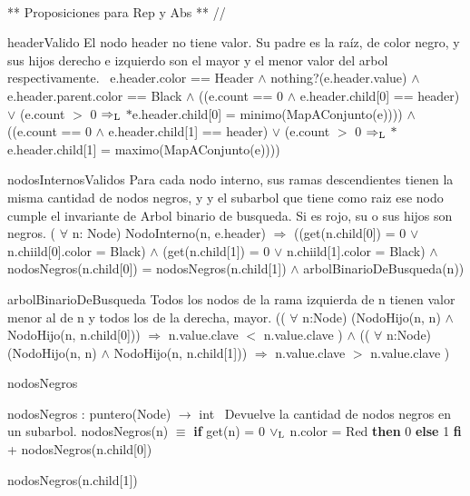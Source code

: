 \begin{DoxyVerb}\\ ** Proposiciones para Rep y Abs ** //
\end{DoxyVerb}


\begin{DoxyParagraph}{header\+Valido}
El nodo header no tiene valor. Su padre es la raíz, de color negro, y sus hijos derecho e izquierdo son el mayor y el menor valor del arbol respectivamente.~\newline
 e.\+header.\+color == Header $\land$ nothing?(e.\+header.\+value) $\land$ e.\+header.\+parent.\+color == Black $\land$ ((e.\+count == 0 $\land$ e.\+header.\+child\mbox{[}0\mbox{]} == header) $\lor$ (e.\+count $>$ 0 $\Rightarrow_{\rm L}$ $\ast$e.header.\+child\mbox{[}0\mbox{]} = minimo(\+Map\+A\+Conjunto(e)))) $\land$ ((e.\+count == 0 $\land$ e.\+header.\+child\mbox{[}1\mbox{]} == header) $\lor$ (e.\+count $>$ 0 $\Rightarrow_{\rm L}$ $\ast$e.header.\+child\mbox{[}1\mbox{]} = maximo(\+Map\+A\+Conjunto(e)))) 
\end{DoxyParagraph}


\begin{DoxyParagraph}{nodos\+Internos\+Validos}
Para cada nodo interno, sus ramas descendientes tienen la misma cantidad de nodos negros, y y el subarbol que tiene como raiz ese nodo cumple el invariante de Arbol binario de busqueda. Si es rojo, su o sus hijos son negros. ( $\forall$ n\+: Node) Nodo\+Interno(n, e.\+header) $\Rightarrow$ ((get(n.\+child\mbox{[}0\mbox{]}) = 0 $\lor$ n.\+chiild\mbox{[}0\mbox{]}.color = Black) $\land$ (get(n.\+child\mbox{[}1\mbox{]}) = 0 $\lor$ n.\+chiild\mbox{[}1\mbox{]}.color = Black) $\land$ nodos\+Negros(n.\+child\mbox{[}0\mbox{]}) = nodos\+Negros(n.\+child\mbox{[}1\mbox{]}) $\land$ arbol\+Binario\+De\+Busqueda(n)) 
\end{DoxyParagraph}


\begin{DoxyParagraph}{arbol\+Binario\+De\+Busqueda}
Todos los nodos de la rama izquierda de n tienen valor menor al de n y todos los de la derecha, mayor. (( $\forall$ n\textquotesingle{}\+:Node) (Nodo\+Hijo(n\textquotesingle{}, n) $\land$ Nodo\+Hijo(n\textquotesingle{}, n.\+child\mbox{[}0\mbox{]})) $\Rightarrow$ n\textquotesingle{}.value.\+clave $<$ n.\+value.\+clave ) $\land$ (( $\forall$ n\textquotesingle{}\+:Node) (Nodo\+Hijo(n\textquotesingle{}, n) $\land$ Nodo\+Hijo(n\textquotesingle{}, n.\+child\mbox{[}1\mbox{]})) $\Rightarrow$ n\textquotesingle{}.value.\+clave $>$ n.\+value.\+clave )
\end{DoxyParagraph}
\begin{DoxyParagraph}{nodos\+Negros}


nodos\+Negros \+: puntero(\+Node) $\to$ int~\newline
 Devuelve la cantidad de nodos negros en un subarbol. nodos\+Negros(n) $\equiv$ {\bfseries if} get(n) = 0 $\lor_{\rm L}$ n.\+color = Red {\bfseries then} 0 {\bfseries else} 1 {\bfseries fi} + nodos\+Negros(n.\+child\mbox{[}0\mbox{]})
\begin{DoxyItemize}
\item nodos\+Negros(n.\+child\mbox{[}1\mbox{]}) 
\end{DoxyItemize}
\end{DoxyParagraph}


